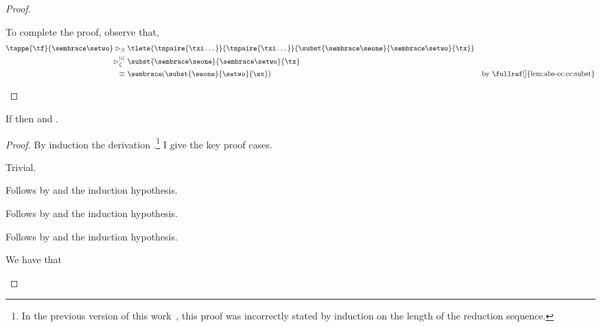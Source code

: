 {\begin{proof}
\begin{proofcases}
    To complete the proof, observe that,
    \begin{align}
      \tappe{\tf}{\cctrans{\setwo}} \step_{\beta}~
      & \tlete{\tnpaire{\txi\dots}}{\tnpaire{\txi\dots}}{\subst{\cctrans{\seone}}{\cctrans{\setwo}}{\tx}} \\
      {\step_{\zeta}^{\len{i}}}~& {\subst{\cctrans{\seone}}{\cctrans{\setwo}}{\tx}} \\
      \equiv~&\cctrans{(\subst{\seone}{\setwo}{\sx})} & \text{by \fullref[]{lem:abs-cc:cc:subst}}
    \end{align}
  \end{proofcases}
\end{proof}

\begin{lemma}
  \label{lem:abs-cc:cc:pres-norm}
  If \im{\sstepjudg[\stepstar]{\slenv}{\se}{\sepr}} then
  \im{\tstepjudg[\stepstar]{\cctrans{\slenv}}{\cctrans{\se}}{\te}} and \im{\tequivjudg{\cctrans{\slenv}}{\te}{\cctrans{\sepr}}}.
\end{lemma}
\begin{proof}
  By induction the derivation \im{\sstepjudg[\stepstar]{\slenv}{\se}{\sepr}}.\footnote{In the previous version of this work~\cite{bowman2018:cccc}, this proof was incorrectly stated by induction on the length of the reduction sequence.}
  I give the key proof cases.
  \begin{proofcases}
    \item {}

      Trivial.

    \item {}

      Follows by  and the induction hypothesis.

    \item {}

      Follows by  and the induction hypothesis.

    \item {}

      Follows by  and the induction hypothesis.

    \item {}

      We have that
      \im{
        \inferrule*[right={\rulename{Red-Cong-Lam}}]
        {\sstepjudg[\stepstar]{\slenv}{\sA}{\sApr} \\
         \sstepjudg[\stepstar]{\slenv,\sx:\sApr}{\se}{\sepr}}
        {\sstepjudg[\stepstar]{\slenv}{\sfune{\sx}{\sA}{\se}}{\sfune{\sx}{\sApr}{\sepr}}}
      }


\end{proofcases}
\end{proof}}

